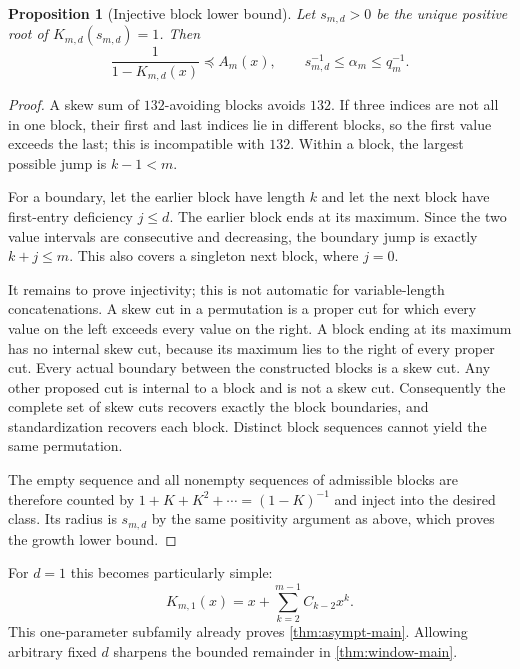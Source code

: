 \documentclass[11pt,a4paper]{article}
\newtheorem{proposition}[proposition]{Proposition}
\theoremstyle{definition}\newaliascnt{definition}{theorem}
\theoremstyle{remark}\newaliascnt{remark}{theorem}
\newcommand{\preceqc}{\preceq}
\begin{document}
\begin{proposition}[Injective block lower bound]\label{prop:lower}
Let $s_{m,d}>0$ be the unique positive root of $K_{m,d}(s_{m,d})=1$. Then
\begin{equation}
 \frac{1}{1-K_{m,d}(x)}\preceqc A_m(x),\qquad
 s_{m,d}^{-1}\le\alpha_m\le q_m^{-1}.
 \label{eq:root-sandwich}
\end{equation}
\end{proposition}
\begin{proof}
A skew sum of $132$-avoiding blocks avoids $132$. If three indices are not
all in one block, their first and last indices lie in different blocks,
so the first value exceeds the last; this is incompatible with $132$.
Within a block, the largest possible jump is $k-1<m$.

For a boundary, let the earlier block have length $k$ and let the next
block have first-entry deficiency $j\le d$. The earlier block ends at its
maximum. Since the two value intervals are consecutive and decreasing,
the boundary jump is exactly $k+j\le m$. This also covers a singleton next
block, where $j=0$.

It remains to prove injectivity; this is not automatic for variable-length
concatenations. A skew cut in a permutation is a proper cut for which every
value on the left exceeds every value on the right. A block ending at its
maximum has no internal skew cut, because its maximum lies to the right
of every proper cut. Every actual boundary between the constructed blocks
is a skew cut. Any other proposed cut is internal to a block and is not a
skew cut. Consequently the complete set of skew cuts recovers exactly the
block boundaries, and standardization recovers each block. Distinct block
sequences cannot yield the same permutation.

The empty sequence and all nonempty sequences of admissible blocks are
therefore counted by $1+K+K^2+\cdots=(1-K)^{-1}$ and inject into the desired
class. Its radius is $s_{m,d}$ by the same positivity argument as above,
which proves the growth lower bound.
\end{proof}

For $d=1$ this becomes particularly simple:
\begin{equation}
 K_{m,1}(x)=x+\sum_{k=2}^{m-1}C_{k-2}x^k.
 \label{eq:K1}
\end{equation}
This one-parameter subfamily already proves \cref{thm:asympt-main}.
Allowing arbitrary fixed $d$ sharpens the bounded remainder in
\cref{thm:window-main}.
\end{document}
